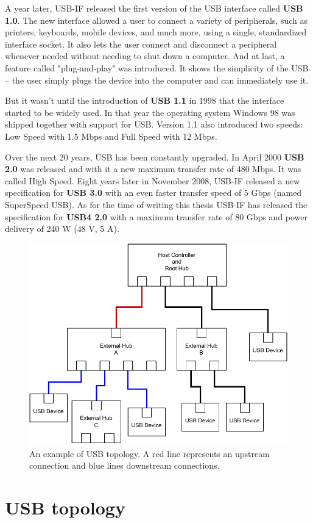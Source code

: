 A year later, USB-IF released the first version of the USB interface called \textbf{USB 1.0}. The new interface allowed a user to connect a variety of peripherals, such as printers, keyboards, mobile devices, and much more, using a single, standardized interface socket. It also lets the user connect and disconnect a peripheral whenever needed without needing to shut down a computer. And at last, a feature called "plug-and-play" was introduced. It shows the simplicity of the USB \--- the user simply plugs the device into the computer and can immediately use it.

But it wasn't until the introduction of \textbf{USB 1.1} in 1998 that the interface started to be widely used. In that year the operating system Windows 98 was shipped together with support for USB. Version 1.1 also introduced two speeds: Low Speed with 1.5 Mbps and Full Speed with 12 Mbps.

Over the next 20 years, USB has been constantly upgraded. In April 2000 \textbf{USB 2.0} was released and with it a new maximum transfer rate of 480 Mbps. It was called High Speed. Eight years later in November 2008, USB-IF released a new specification for \textbf{USB 3.0} with an even faster transfer speed of 5 Gbps (named SuperSpeed USB). As for the time of writing this thesis USB-IF has released the specification for \textbf{USB4 2.0} with a maximum transfer rate of 80 Gbps and power delivery of 240 W (48 V, 5 A).

\begin{figure}[ht]
    \centering
    \includegraphics[width=0.7\linewidth]{./obrazky-figures/usb_hub_model.pdf}
    \caption{An example of USB topology. A red line represents an upstream connection and blue lines downstream connections.}
    \label{fig:usb_topology}
\end{figure}
\section{USB topology}
\label{sec:topology}

